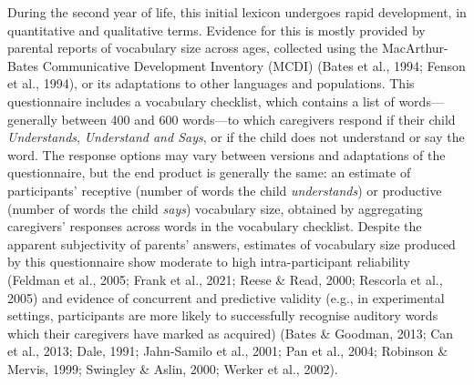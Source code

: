 \documentclass[
  12pt,
  b5paperpaper,
  twoside]{scrreprt}
\begin{document}
During the second year of life, this initial lexicon undergoes rapid
development, in quantitative and qualitative terms. Evidence for this is
mostly provided by parental reports of vocabulary size across ages,
collected using the MacArthur-Bates Communicative Development Inventory
(MCDI) (Bates et al., 1994; Fenson et al., 1994), or its adaptations to
other languages and populations. This questionnaire includes a
vocabulary checklist, which contains a list of words---generally between
400 and 600 words---to which caregivers respond if their child
\emph{Understands}, \emph{Understand and Says}, or if the child does not
understand or say the word. The response options may vary between
versions and adaptations of the questionnaire, but the end product is
generally the same: an estimate of participants' receptive (number of
words the child \emph{understands}) or productive (number of words the
child \emph{says}) vocabulary size, obtained by aggregating caregivers'
responses across words in the vocabulary checklist. Despite the apparent
subjectivity of parents' answers, estimates of vocabulary size produced
by this questionnaire show moderate to high intra-participant
reliability (Feldman et al., 2005; Frank et al., 2021; Reese \& Read,
2000; Rescorla et al., 2005) and evidence of concurrent and predictive
validity (e.g., in experimental settings, participants are more likely
to successfully recognise auditory words which their caregivers have
marked as acquired) (Bates \& Goodman, 2013; Can et al., 2013; Dale,
1991; Jahn-Samilo et al., 2001; Pan et al., 2004; Robinson \& Mervis,
1999; Swingley \& Aslin, 2000; Werker et al., 2002).
\end{document}
